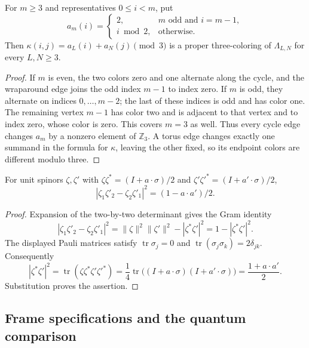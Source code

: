 \begin{lemma}\label{l:colour}
For \(m\ge3\) and representatives \(0\le i<m\), put
\[
 a_m(i)=\begin{cases}2,&m\text{ odd and }i=m-1,\\i\bmod2,&\text{otherwise}.
 \end{cases}
\]
Then \(\kappa(i,j)=a_L(i)+a_N(j)\pmod3\) is a proper
three-coloring of \(\Lambda_{L,N}\) for every \(L,N\ge3\).
\end{lemma}

\begin{proof}
If \(m\) is even, the two colors zero and one alternate along
the cycle, and the wraparound edge joins the odd index \(m-1\)
to index zero. If \(m\) is odd, they alternate on indices
\(0,\ldots,m-2\); the last of these indices is odd and has
color one. The remaining vertex \(m-1\) has color two and is
adjacent to that vertex and to index zero, whose color is zero.
This covers \(m=3\) as well. Thus every cycle edge changes
\(a_m\) by a nonzero element of \(\mathbb Z_3\).
A torus edge changes exactly one summand in the formula for
\(\kappa\), leaving the other fixed, so its endpoint colors
are different modulo three.
\end{proof}

\begin{lemma}\label{l:qmod}
For unit spinors \(\zeta,\zeta'\) with
\(\zeta\zeta^*=(I+a\cdot\sigma)/2\) and
\(\zeta'\zeta'^*=(I+a'\cdot\sigma)/2\),
\[
 |\zeta_1\zeta'_2-\zeta_2\zeta'_1|^2=(1-a\cdot a')/2 .
\]
\end{lemma}

\begin{proof}
Expansion of the two-by-two determinant gives the Gram identity
\[
 |\zeta_1\zeta'_2-\zeta_2\zeta'_1|^2
       =\|\zeta\|^2\|\zeta'\|^2-|\zeta^*\zeta'|^2
       =1-|\zeta^*\zeta'|^2.
\]
The displayed Pauli matrices satisfy
\(\operatorname{tr}\sigma_j=0\) and
\(\operatorname{tr}(\sigma_j\sigma_k)=2\delta_{jk}\).
Consequently
\[
 |\zeta^*\zeta'|^2
 =\operatorname{tr}(\zeta\zeta^*\zeta'\zeta'^*)
 =\frac14\operatorname{tr}\bigl((I+a\cdot\sigma)
                               (I+a'\cdot\sigma)\bigr)
 =\frac{1+a\cdot a'}2.
\]
Substitution proves the assertion.
\end{proof}

\subsection{Frame specifications and the quantum comparison}


